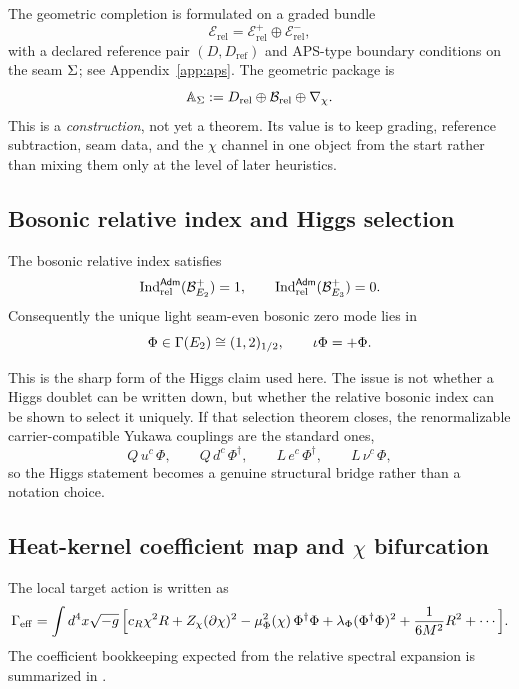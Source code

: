 The geometric completion is formulated on a graded bundle
\[
\mathcal E_{\mathrm{rel}}=\mathcal E_{\mathrm{rel}}^+\oplus\mathcal E_{\mathrm{rel}}^-,
\]
with a declared reference pair $(D,D_{\mathrm{ref}})$ and APS-type boundary conditions on the seam $\Sigma$; see Appendix~\ref{app:aps}. The geometric package is
\[
\mathbb A_{\Sigma}:=D_{\mathrm{rel}}\oplus\mathcal B_{\mathrm{rel}}\oplus\nabla_\chi.
\]
This is a \emph{construction}, not yet a theorem. Its value is to keep grading, reference subtraction, seam data, and the $\chi$ channel in one object from the start rather than mixing them only at the level of later heuristics.

\subsection{Bosonic relative index and Higgs selection}

\begin{conjecture}
The bosonic relative index satisfies
\[
\operatorname{Ind}_{\mathrm{rel}}^{\mathsf{Adm}}(\mathcal B_{E_2}^+)=1,
\qquad
\operatorname{Ind}_{\mathrm{rel}}^{\mathsf{Adm}}(\mathcal B_{E_3}^+)=0.
\]
Consequently the unique light seam-even bosonic zero mode lies in
\[
\Phi\in\Gamma(E_2)\cong (1,2)_{1/2},
\qquad
\iota\Phi=+\Phi.
\]
\end{conjecture}

This is the sharp form of the Higgs claim used here. The issue is not whether a Higgs doublet can be written down, but whether the relative bosonic index can be shown to select it uniquely.
If that selection theorem closes, the renormalizable carrier-compatible Yukawa couplings are the standard ones,
\[
Q\,u^c\,\Phi,
\qquad
Q\,d^c\,\Phi^\dagger,
\qquad
L\,e^c\,\Phi^\dagger,
\qquad
L\,\nu^c\,\Phi,
\]
so the Higgs statement becomes a genuine structural bridge rather than a notation choice.

\subsection{Heat-kernel coefficient map and \texorpdfstring{$\chi$}{chi} bifurcation}

The local target action is written as
\begin{equation}
\label{eq:chi-effective-action}
\begin{aligned}
\Gamma_{\mathrm{eff}}
=
\int d^4x\sqrt{-g}\,
\Big[
c_R\chi^2R
+Z_\chi(\partial\chi)^2
-\mu_\Phi^2(\chi)\,\Phi^\dagger\Phi
+\lambda_\Phi(\Phi^\dagger\Phi)^2
+\frac{1}{6M^2}R^2
+\cdots
\Big].
\end{aligned}
\end{equation}
The coefficient bookkeeping expected from the relative spectral expansion is summarized in .

